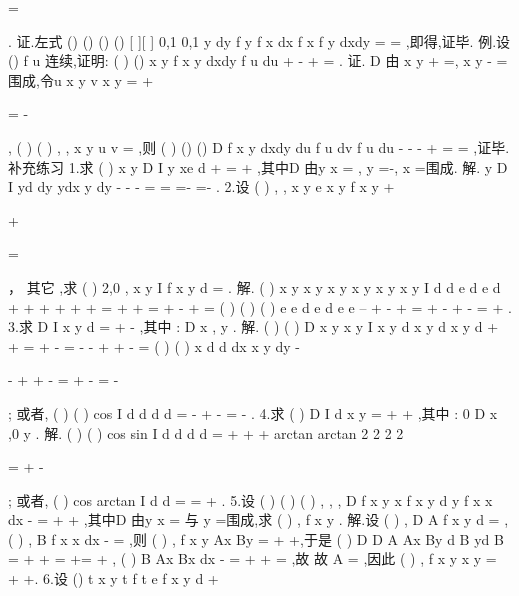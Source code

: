 =




\int \int 
\int 
. 
证.左式
()
()
()
()
[
][
]
0,1
0,1
y
dy
f
y f x dx
f x f
y dxdy
\times 
=
=
\int \int 
\int \int 
,即得,证毕. 
\textcolor{lyred}{例}.设
()
f u 连续,证明:
(
)
()
x
y
f x
y dxdy
f u du
+
\le 
-
+
=
\int \int 
\int 
. 
证. D 由
x
y
+
=\pm ,
x
y
-
=\pm 围成,令u
x
y
v
x
y
=
+

=
-

,
(
)
(
)
,
,
x y
u v
\partial 
=
\partial 
,则 
(
)
()
()
D
f x
y dxdy
du
f u dv
f u du
-
-
-
+
=
=
\int \int 
\int 
\int 
\int 
,证毕. 
\textcolor{lyred}{补充练习 }
1.求
(
)
x
y
D
I
y
xe
d\sigma 
+
=
+
\int \int 
,其中D 由y
x
=
,
y =-,
x =围成. 
解.
y
D
I
yd
dy
ydx
y dy
\sigma 
-
-
-
=
=
=-
=-
\int \int 
\int 
\int 
\int 
. 
2.设
(
)
,
,
x
y
e
x
y
f x y
+

\le 
+
\le 

=

，
其它
,求
(
)
2,0
,
x
y
I
f x y d\sigma 
\le \le 
\le \le 
=
\int \int 
. 
解.
(
)
x
y
x
y
x
y
x
y
x
y
x
y
I
d
d
e
d
e
d
\pi 
\sigma 
\sigma 
\sigma 
\pi 
\sigma 
+
+
+
\le 
+
\ge 
\le 
+
\le 
\le 
+
\le 
=
+
+
=
+
-
+
=
\int \int 
\int \int 
\int \int 
\int \int 
(
)
(
)
(
)
e
e
d
e
d
e
e
\pi 
\rho 
\pi 
\pi 
\pi 
\pi 
\theta 
\rho \rho 
\pi 
\pi 
--
+
-
+
=
+
-
+
-
=
+
\int 
\int 
. 
3.求
D
I
x
y
d\sigma 
=
+
-
\int \int 
,其中
:
D
x \le ,
y \le . 
解.
(
)
(
)
D
x
y
x
y
I
x
y
d
x
y
d
x
y
d
\sigma 
\sigma 
\sigma 
+
\le 
+
\ge 
=
+
-
=
-
-
+
+
-
=
\int \int 
\int \int 
\int \int 
(
)
(
)
x
d
d
dx
x
y
dy
\pi 
\pi 
\pi 
\theta 
\rho 
\rho \rho 
\pi 
-


-
+
+
-
=
+
-
=
-




\int 
\int 
\int 
\int 
; 
或者,
(
)
(
)
cos
I
d
d
d
d
\pi 
\pi 
\theta 
\theta 
\rho 
\rho \rho 
\theta 
\rho 
\rho \rho 
\pi 
=
-
+
-
=
-
\int 
\int 
\int 
\int 
. 
4.求
(
)
D
I
d
x
y
\sigma 
=
+
+
\int \int 
,其中
: 0
D
x
\le 
\le ,0
y
\le 
\le . 
解.
(
)
(
)
cos
sin
I
d
d
d
d
\pi 
\pi 
\theta 
\theta 
\pi 
\theta 
\rho \rho 
\theta 
\rho \rho 
\rho 
\rho 
=
+
+
+
\int 
\int 
\int 
\int 
arctan
arctan
2 2
2 2
\pi 


=
+
-




; 
或者,
(
)
cos
arctan
I
d
d
\pi 
\theta 
\theta 
\rho \rho 
\rho 
=
=
+
\int 
\int 
. 
5.设
(
)
(
)
(
)
,
,
,
D
f x y
x
f x y d
y
f x x dx
\sigma 
-
=
+
+
\int \int 
\int 
,其中D 由y
x
=
与
y =围成,求 
(
)
,
f x y . 
解.设
(
)
,
D
A
f x y d\sigma 
=\int \int 
,
(
)
,
B
f x x dx
-
=\int 
,则
(
)
,
f x y
Ax
By
=
+
+,于是 
(
)
D
D
A
Ax
By
d
B
yd
B
\sigma 
\sigma 
=
+
+
=
+=
+
\int \int 
\int \int 
,
(
)
B
Ax
Bx
dx
-
=
+
+
=
\int 
,故 
故
A =
,因此
(
)
,
f x y
x
y
=
+
+. 
6.设
()
t
x
y
t
f t
e
f
x
y
d
\pi 
\sigma 
+
\le 


